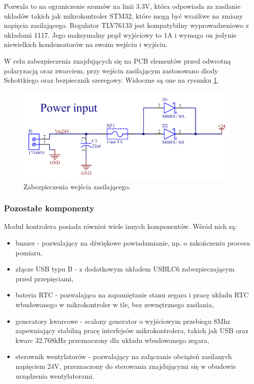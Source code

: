 Pozwala to na ograniczenie szumów na linii 3.3V, która odpowiada za zasilanie układów takich jak mikrokontroler STM32, które mogą być wrażliwe na zmiany
napięcia zasilającego. Regulator TLV76133 \cite{TLV76133} jest kompatybilny wyprowadzeniowo z układami 1117. Jego maksymalny prąd wyjściowy to 1A i wymaga on jedynie niewielkich kondensatorów na swoim wejściu i wyjściu.

W celu zabezpieczenia znajdujących się na PCB elementów przed odwrotną polaryzacją oraz zwarciem, przy wejściu zasilającym zastosowano diody Schottkiego oraz bezpiecznik szeregowy.
Widoczne są one na rysunku \ref{fig:sekcjaZabezpieczn}.

\begin{figure}[h!]
    \begin{center}
        \includegraphics[width = 15cm]{images/wejsciezasilania_3.png}
        \caption{Zabezpieczenia wejścia zasilającego.} 
        \label{fig:sekcjaZabezpieczn}
    \end{center}
\end{figure}








\subsubsection{Pozostałe komponenty}

Moduł kontrolera posiada również wiele innych komponentów. Wśród nich są: 

\begin{itemize}
    \item buzzer - pozwalający na dźwiękowe powiadamianie, np. o zakończeniu procesu pomiaru,
    \item złącze USB typu B - z dodatkowym układem USBLC6 zabezpieczającym przed przepięciami,
    \item bateria RTC - pozwalająca na zapamiętanie stanu zegara i pracę układu RTC wbudowanego w mikrokontroler w tle, bez zewnętrznego zasilania,
    \item generatory kwarcowe - scalony generator o wyjściowym przebiegu 8Mhz zapewniający stabilną pracę interfejsów mikrokontrolera, takich jak USB oraz kwarc 32.768kHz przeznaczony dla układu wbudowanego zegara,
    \item sterownik wentylatorów - pozwalający na załączanie obciążeń zasilanych napięciem 24V, przeznaczony do sterowania znajdującymi się w obudowie urządzenia wentylatorami.
\end{itemize}

